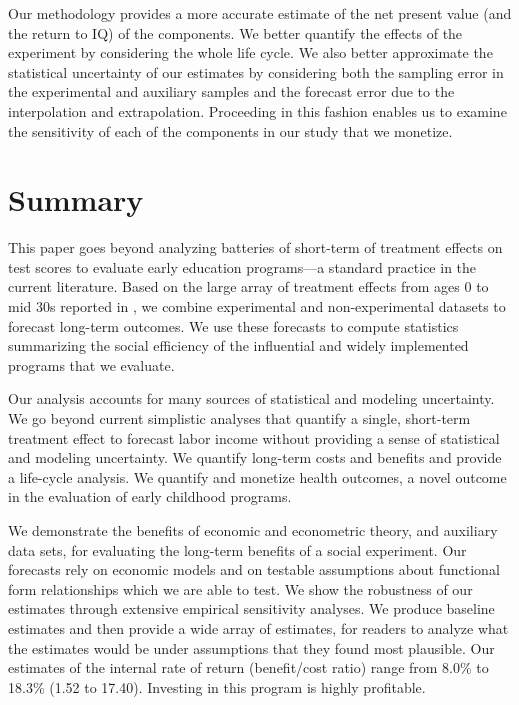 Our methodology provides a more accurate estimate of the net present value (and the return to IQ) of the components. We better quantify the effects of the experiment by considering the whole life cycle. We also better approximate the statistical uncertainty of our estimates by considering both the sampling error in the experimental and auxiliary samples and the forecast error due to the interpolation and extrapolation. Proceeding in this fashion enables us to examine the sensitivity of each of the components in our study that we monetize.

\section{Summary} \label{section:conclusion}

This paper goes beyond analyzing batteries of short-term of treatment effects on test scores to evaluate early education programs---a standard practice in the current literature. Based on the large array of treatment effects from ages 0 to mid 30s reported in \citet{Garcia_Heckman_Ziff_2017_Gender-Diff_UNPUBLISHED}, we combine experimental and non-experimental datasets to forecast long-term outcomes. We use these forecasts to compute statistics summarizing the social efficiency of the influential and widely implemented programs that we evaluate.

Our analysis accounts for many sources of statistical and modeling uncertainty. We go beyond current simplistic analyses that quantify a single, short-term treatment effect to forecast labor income without providing a sense of statistical and modeling uncertainty. We quantify long-term costs and benefits and provide a life-cycle analysis. We quantify and monetize health outcomes, a novel outcome in the evaluation of early childhood programs.

We demonstrate the benefits of economic and econometric theory, and auxiliary data sets, for evaluating the long-term benefits of a social experiment. Our forecasts rely on economic models and on testable assumptions about functional form relationships which we are able to test. We show the robustness of our estimates through extensive empirical sensitivity analyses. We produce baseline estimates and then provide a wide array of estimates, for readers to analyze what the estimates would be under assumptions that they found most plausible. Our estimates of the internal rate of return (benefit/cost ratio) range from 8.0\% to 18.3\% (1.52 to 17.40). Investing in this program is highly profitable.

\clearpage

\singlespace



 
